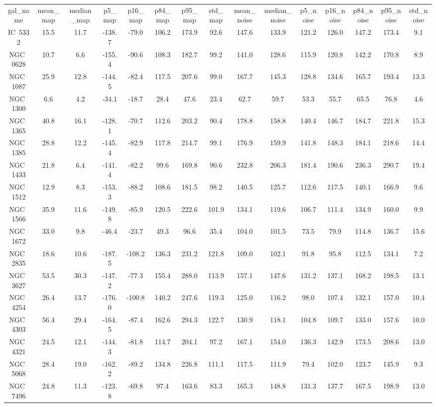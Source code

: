 \begin{table}
\begin{tabular}{ccccccccccccccc}
gal_name & mean_map & median_map & p5_map & p16_map & p84_map & p95_map & std_map & mean_noise & median_noise & p5_noise & p16_noise & p84_noise & p95_noise & std_noise \\
IC~5332 & 15.5 & 11.7 & -138.7 & -79.0 & 106.2 & 173.9 & 92.6 & 147.6 & 133.9 & 121.2 & 126.0 & 147.2 & 173.4 & 9.1 \\
NGC~0628 & 10.7 & 6.6 & -155.4 & -90.6 & 108.3 & 182.7 & 99.2 & 141.0 & 128.6 & 115.9 & 120.8 & 142.2 & 170.8 & 8.9 \\
NGC~1087 & 25.9 & 12.8 & -144.5 & -82.4 & 117.5 & 207.6 & 99.0 & 167.7 & 145.3 & 128.8 & 134.6 & 165.7 & 193.4 & 13.3 \\
NGC~1300 & 6.6 & 4.2 & -34.1 & -18.7 & 28.4 & 47.6 & 23.4 & 62.7 & 59.7 & 53.3 & 55.7 & 65.5 & 76.8 & 4.6 \\
NGC~1365 & 40.8 & 16.1 & -128.1 & -70.7 & 112.6 & 203.2 & 90.4 & 178.8 & 158.8 & 140.4 & 146.7 & 184.7 & 221.8 & 15.3 \\
NGC~1385 & 28.8 & 12.2 & -145.4 & -82.9 & 117.8 & 214.7 & 99.1 & 176.9 & 159.9 & 141.8 & 148.3 & 184.1 & 218.6 & 14.4 \\
NGC~1433 & 21.8 & 6.4 & -141.4 & -82.2 & 99.6 & 169.8 & 90.6 & 232.8 & 206.3 & 181.4 & 190.6 & 236.3 & 290.7 & 19.4 \\
NGC~1512 & 12.9 & 8.3 & -153.3 & -88.2 & 108.6 & 181.5 & 98.2 & 140.5 & 125.7 & 112.6 & 117.5 & 140.1 & 166.9 & 9.6 \\
NGC~1566 & 35.9 & 11.6 & -149.8 & -85.9 & 120.5 & 222.6 & 101.9 & 134.1 & 119.6 & 106.7 & 111.4 & 134.9 & 160.0 & 9.9 \\
NGC~1672 & 33.0 & 9.8 & -46.4 & -23.7 & 49.3 & 96.6 & 35.4 & 104.0 & 101.5 & 73.5 & 79.9 & 114.8 & 136.7 & 15.6 \\
NGC~2835 & 18.6 & 10.6 & -187.5 & -108.2 & 136.3 & 231.2 & 121.8 & 109.0 & 102.1 & 91.8 & 95.8 & 112.5 & 134.1 & 7.2 \\
NGC~3627 & 53.5 & 30.3 & -147.2 & -77.3 & 155.4 & 288.0 & 113.9 & 157.1 & 147.6 & 131.2 & 137.1 & 168.2 & 198.5 & 13.1 \\
NGC~4254 & 26.4 & 13.7 & -176.0 & -100.8 & 140.2 & 247.6 & 119.3 & 125.0 & 116.2 & 98.0 & 107.4 & 132.1 & 157.0 & 10.4 \\
NGC~4303 & 56.4 & 29.4 & -164.5 & -87.4 & 162.6 & 294.3 & 122.7 & 130.9 & 118.1 & 104.8 & 109.7 & 133.0 & 157.6 & 10.0 \\
NGC~4321 & 24.5 & 12.1 & -144.3 & -81.8 & 114.7 & 204.1 & 97.2 & 167.1 & 154.0 & 136.3 & 142.9 & 173.5 & 208.6 & 13.0 \\
NGC~5068 & 28.4 & 19.0 & -162.2 & -89.2 & 134.8 & 226.8 & 111.1 & 117.5 & 111.9 & 79.4 & 102.0 & 123.7 & 145.9 & 9.3 \\
NGC~7496 & 24.8 & 11.3 & -123.8 & -69.8 & 97.4 & 163.6 & 83.3 & 165.3 & 148.8 & 131.3 & 137.7 & 167.5 & 198.9 & 13.0 \\
\end{tabular}
\end{table}
